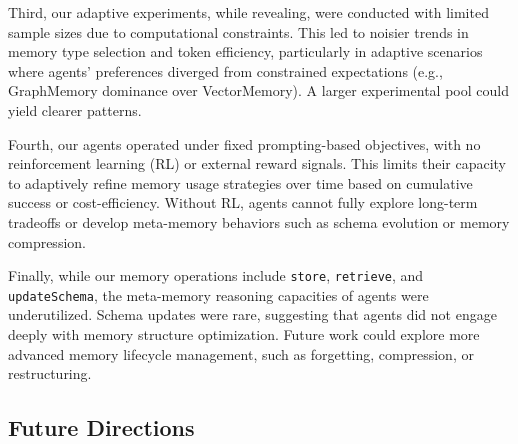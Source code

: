 \documentclass[10pt]{article}
\begin{document}
Third, our adaptive experiments, while revealing, were conducted with limited sample sizes due to computational constraints. This led to noisier trends in memory type selection and token efficiency, particularly in adaptive scenarios where agents' preferences diverged from constrained expectations (e.g., GraphMemory dominance over VectorMemory). A larger experimental pool could yield clearer patterns.

Fourth, our agents operated under fixed prompting-based objectives, with no reinforcement learning (RL) or external reward signals. This limits their capacity to adaptively refine memory usage strategies over time based on cumulative success or cost-efficiency. Without RL, agents cannot fully explore long-term tradeoffs or develop meta-memory behaviors such as schema evolution or memory compression.

Finally, while our memory operations include \texttt{store}, \texttt{retrieve}, and \texttt{updateSchema}, the meta-memory reasoning capacities of agents were underutilized. Schema updates were rare, suggesting that agents did not engage deeply with memory structure optimization. Future work could explore more advanced memory lifecycle management, such as forgetting, compression, or restructuring.

\subsection{Future Directions}
\end{document}
